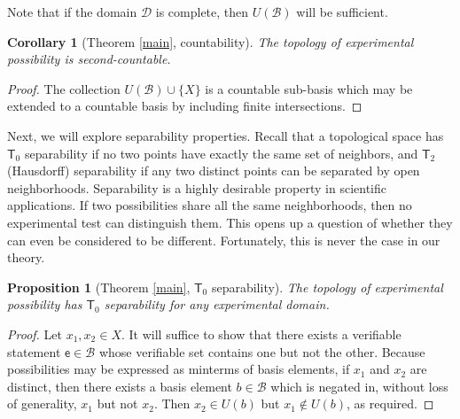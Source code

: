 \documentclass[psamsfonts]{amsart}
\newtheorem{cor}[thm]{Corollary}
\newtheorem{prop}[thm]{Proposition}
\theoremstyle{definition}
\theoremstyle{remark}
\numberwithin{equation}{section}
\newcommand{\edomain}[1][D] {\mathcal{#1}}
\newcommand{\basis}[1][B] {\mathcal{#1}} %
\begin{document}
Note that if the domain $\edomain$ is complete, then $U(\basis)$ will be sufficient. 

\begin{cor}[Theorem \ref{main}, countability]
The topology of experimental possibility is second-countable.
\end{cor}
\begin{proof}
The collection $U(\basis)\cup\{X\}$ is a countable sub-basis which may be extended to a countable basis by including finite intersections. 
\end{proof}


Next, we will explore separability properties. Recall that a topological space has $\mathsf{T}_0$ separability if no two points have exactly the same set of neighbors, and $\mathsf{T}_2$ (Hausdorff) separability if any two distinct points can be separated by open neighborhoods. Separability is a highly desirable property in scientific applications. If two possibilities share all the same neighborhoods, then no experimental test can distinguish them. This opens up a question of whether they can even be considered to be different. Fortunately, this is never the case in our theory. 

\begin{prop}[Theorem \ref{main}, $\mathsf{T}_0$ separability]
The topology of experimental possibility has $\mathsf{T}_0$ separability for any experimental domain. 
\end{prop}
\begin{proof}
Let $x_1,x_2\in X$. It will suffice to show that there exists a verifiable statement $\mathsf{e}\in\basis$ whose verifiable set contains one but not the other. Because possibilities may be expressed as minterms of basis elements, if $x_1$ and $x_2$ are distinct, then there exists a basis element $b\in\basis$ which is negated in, without loss of generality, $x_1$ but not $x_2$. Then $x_2\in U(b)$ but $x_1\notin U(b)$, as required. 
\end{proof}
\end{document}
